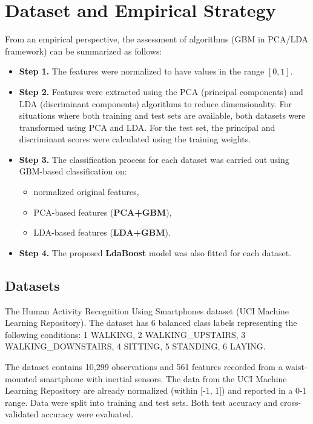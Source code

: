 \documentclass[11pt,a4paper]{article}
\providecommand{\DIFaddend}{}
\begin{document}
\DIFaddend  \section{Dataset and Empirical Strategy}
From an empirical perspective, the assessment of algorithms (GBM in PCA/LDA framework) can be summarized as follows:

\begin{itemize}
    \item \textbf{Step 1.} The features were normalized to have values in the range $[0,1]$.

    \item \textbf{Step 2.} Features were extracted using the PCA (principal components) and LDA (discriminant components) algorithms to reduce dimensionality.  
    For situations where both training and test sets are available, both datasets were transformed using PCA and LDA.  
    For the test set, the principal and discriminant scores were calculated using the training weights.

    \item \textbf{Step 3.} The classification process for each dataset was carried out using GBM-based classification on:
    \begin{itemize}
        \item normalized original features,
        \item PCA-based features (\textbf{PCA+GBM}),
        \item LDA-based features (\textbf{LDA+GBM}).
    \end{itemize}

    \item \textbf{Step 4.} The proposed \textbf{LdaBoost} model was also fitted for each dataset.
\end{itemize}


\subsection*{Datasets}
The Human Activity Recognition Using Smartphones dataset (UCI Machine Learning Repository). The dataset has 6 balanced class labels representing the following conditions: 1 WALKING, 2 WALKING\_UPSTAIRS, 3 WALKING\_DOWNSTAIRS, 4 SITTING, 5 STANDING, 6 LAYING.

The dataset contains 10,299 observations and 561 features recorded from a waist-mounted smartphone with inertial sensors. The data from the UCI Machine Learning Repository are already normalized (within [-1, 1]) and reported in a 0-1 range. Data were split into training and test sets. Both test accuracy and cross-validated accuracy were evaluated.
\end{document}
